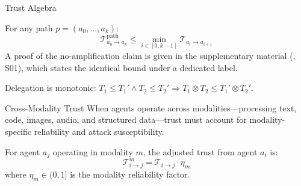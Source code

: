 \documentclass[
  ignorenonframetext,
]{beamer}
\providecommand{\cref}[1]{\texttt{\detokenize{#1}}}
\begin{document}
\begin{frame}[allowframebreaks]{Trust Algebra}
\begin{theorem}
\label{thm:no-trust-amp}
For any path $p = (a_0, \ldots, a_k)$:
\begin{equation}
\label{eq:no-amplification}
\mathcal{T}_{a_0 \to a_k}^{\text{path}} \leq \min_{i \in [0,k-1]} \mathcal{T}_{a_i \to a_{i+1}}
\end{equation}
A proof of the no-amplification claim is given in the supplementary material
(\cref{thm:trust-amp-restated}, S01), which states the identical bound under
a dedicated label.
\end{theorem}

\begin{theorem}
\label{thm:trust-monotonic}
Delegation is monotonic: $T_1 \leq T_1' \land T_2 \leq T_2' \Rightarrow T_1 \otimes T_2 \leq T_1' \otimes T_2'$.
\end{theorem}
\end{frame}

\begin{frame}[allowframebreaks]{Cross-Modality Trust}
\protect{}\label{sec:cross-modality-trust}
When agents operate across modalities---processing text, code, images,
audio, and structured data---trust must account for modality-specific
reliability and attack susceptibility.

\begin{definition}
\label{def:modality-trust}
For agent $a_j$ operating in modality $m$, the adjusted trust from agent $a_i$ is:
\begin{equation}
\label{eq:modality-trust}
\mathcal{T}_{i \to j}^{m} = \mathcal{T}_{i \to j} \cdot \eta_m
\end{equation}
where $\eta_m \in (0, 1]$ is the modality reliability factor.
\end{definition}

\end{frame}
\end{document}
